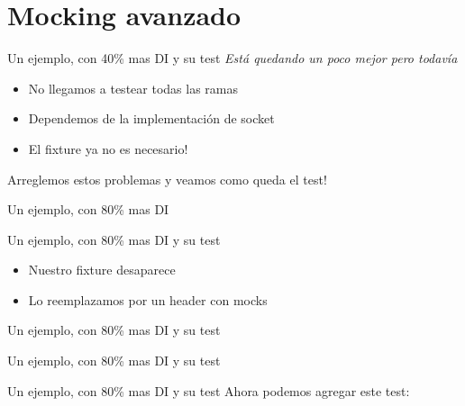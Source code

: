 \section{Mocking avanzado}

\begin{frame}[shrink=2]{Un ejemplo, con 40\% mas DI y su test}
\textit{ Est\'a quedando un poco mejor pero todav\'ia}
\bigskip
\begin{itemize}
	\item No llegamos a testear todas las ramas
	\item Dependemos de la implementaci\'on de socket
	\item El fixture ya no es necesario!
\end{itemize}
\bigskip
\begin{center}
	Arreglemos estos problemas y veamos como queda el test!
\end{center}
\end{frame}


\begin{frame}[shrink=2]{Un ejemplo, con 80\% mas DI}

\end{frame}

\begin{frame}[shrink=2]{Un ejemplo, con 80\% mas DI y su test}
\begin{itemize}
	\item Nuestro fixture desaparece
	\item Lo reemplazamos por un header con mocks
\end{itemize}

\end{frame}

\begin{frame}[shrink]{Un ejemplo, con 80\% mas DI y su test}

\end{frame}

\begin{frame}[shrink]{Un ejemplo, con 80\% mas DI y su test}

\end{frame}

\begin{frame}[shrink]{Un ejemplo, con 80\% mas DI y su test}
Ahora podemos agregar este test:

\end{frame}


